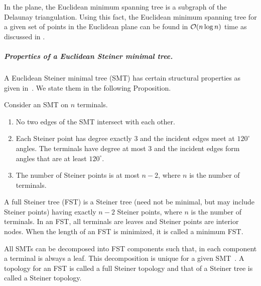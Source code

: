 In the plane, the Euclidean minimum spanning tree is a subgraph of the Delaunay triangulation. Using this fact, the Euclidean minimum spanning tree for a given set of points in the Euclidean plane can be found in $\mathcal{O}(n\log n)$ time as discussed in \cite{Shamos1975ClosestpointP}. 

\subparagraph{Properties of a Euclidean Steiner minimal tree.}
A Euclidean Steiner minimal tree (SMT) has certain structural properties as given in~\cite{cockayne1967steiner}. We state them in the following Proposition.

\begin{proposition}\label{smt-prop}
Consider an SMT on $n$ terminals.
 \begin{enumerate}
   \item No two edges of the SMT intersect with each other.
 
   \item Each Steiner point has degree exactly $3$ and the incident edges meet at $120^\circ$ angles. The terminals have degree at most $3$ and the incident edges form angles that are at least $120^\circ$.
  
   \item The number of Steiner points is at most $n-2$, where $n$ is the number of terminals.

\end{enumerate}
\end{proposition}

 A full Steiner tree (FST) is a Steiner tree (need not be minimal, but may include Steiner points) having exactly $n-2$ Steiner points, where $n$ is the number of terminals. In an FST, all terminals are leaves and Steiner points are interior nodes. When the length of an FST is minimized, it is called a minimum FST.

All SMTs can be decomposed into FST components such that, in each component a terminal is always a  leaf. This decomposition is unique for a given SMT~\cite{hwang1992steiner}. A topology for an FST is called a full Steiner topology and that of a Steiner tree is called a Steiner topology.



